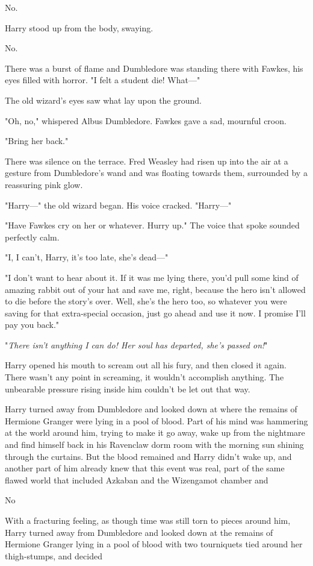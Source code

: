 No.

Harry stood up from the body, swaying.

No.

There was a burst of flame and Dumbledore was standing there with Fawkes, his
eyes filled with horror. "I felt a student die! What---"

The old wizard's eyes saw what lay upon the ground.

"Oh, no," whispered Albus Dumbledore. Fawkes gave a sad, mournful croon.

"Bring her back."

There was silence on the terrace. Fred Weasley had risen up into the air at a
gesture from Dumbledore's wand and was floating towards them, surrounded by a
reassuring pink glow.

"Harry---" the old wizard began. His voice cracked. "Harry---"

"Have Fawkes cry on her or whatever. Hurry up." The voice that spoke sounded
perfectly calm.

"I, I can't, Harry, it's too late, she's dead---"

"I don't want to hear about it. If it was me lying there, you'd pull some kind
of amazing rabbit out of your hat and save me, right, because the hero isn't
allowed to die before the story's over. Well, she's the hero too, so whatever
you were saving for that extra-special occasion, just go ahead and use it now.
I promise I'll pay you back."

"\emph{There isn't anything I can do! Her soul has departed, she's passed on!}"

Harry opened his mouth to scream out all his fury, and then closed it again.
There wasn't any point in screaming, it wouldn't accomplish anything. The
unbearable pressure rising inside him couldn't be let out that way.

Harry turned away from Dumbledore and looked down at where the remains of
Hermione Granger were lying in a pool of blood. Part of his mind was hammering
at the world around him, trying to make it go away, wake up from the nightmare
and find himself back in his Ravenclaw dorm room with the morning sun shining
through the curtains. But the blood remained and Harry didn't wake up, and
another part of him already knew that this event was real, part of the same
flawed world that included Azkaban and the Wizengamot chamber and

No

With a fracturing feeling, as though time was still torn to pieces around him,
Harry turned away from Dumbledore and looked down at the remains of Hermione
Granger lying in a pool of blood with two tourniquets tied around her
thigh-stumps, and decided

